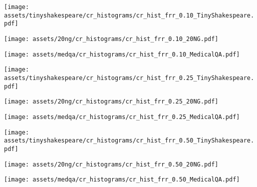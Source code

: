     \begin{minipage}{0.32\textwidth}
        \centering
        \texttt{[image: assets/tinyshakespeare/cr\_histograms/cr\_hist\_frr\_0.10\_TinyShakespeare.pdf]}
    \end{minipage}%
    \hfill
    \begin{minipage}{0.32\textwidth}
        \centering
        \texttt{[image: assets/20ng/cr\_histograms/cr\_hist\_frr\_0.10\_20NG.pdf]}
    \end{minipage}%
    \hfill
    \begin{minipage}{0.32\textwidth}
        \centering
        \texttt{[image: assets/medqa/cr\_histograms/cr\_hist\_frr\_0.10\_MedicalQA.pdf]}
    \end{minipage}%
    
    \begin{minipage}{0.32\textwidth}
        \centering
        \texttt{[image: assets/tinyshakespeare/cr\_histograms/cr\_hist\_frr\_0.25\_TinyShakespeare.pdf]}
    \end{minipage}%
    \hfill
    \begin{minipage}{0.32\textwidth}
        \centering
        \texttt{[image: assets/20ng/cr\_histograms/cr\_hist\_frr\_0.25\_20NG.pdf]}
    \end{minipage}%
    \hfill
    \begin{minipage}{0.32\textwidth}
        \centering
        \texttt{[image: assets/medqa/cr\_histograms/cr\_hist\_frr\_0.25\_MedicalQA.pdf]}
    \end{minipage}%
    
    \begin{minipage}{0.32\textwidth}
        \centering
        \texttt{[image: assets/tinyshakespeare/cr\_histograms/cr\_hist\_frr\_0.50\_TinyShakespeare.pdf]}
        \tightcaption
        \subcaption{}\label{fig:tinyshakespeare-cr-hist}
    \end{minipage}%
    \hfill
    \begin{minipage}{0.32\textwidth}
        \centering
        \texttt{[image: assets/20ng/cr\_histograms/cr\_hist\_frr\_0.50\_20NG.pdf]}
        \tightcaption
        \subcaption{}\label{fig:20ng-cr-hist}
    \end{minipage}%
    \hfill
    \begin{minipage}{0.32\textwidth}
        \centering
        \texttt{[image: assets/medqa/cr\_histograms/cr\_hist\_frr\_0.50\_MedicalQA.pdf]}
        \tightcaption
        \subcaption{}\label{fig:medqa-cr-hist}
    \end{minipage}%